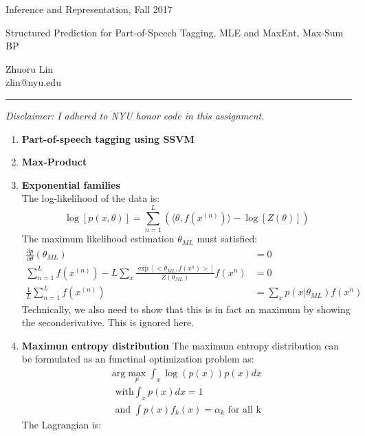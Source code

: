 \documentclass{article}
\newcommand{\ruleskip}{\bigskip\hrule\bigskip}
\begin{document}
\pagestyle{myheadings} 

{\LARGE
\begin{center}Inference and Representation, Fall 2017\end{center}
}

{\Large
Structured Prediction for Part-of-Speech Tagging,
MLE and MaxEnt, Max-Sum BP
}
\begin{center}
Zhuoru Lin\\
zlin@nyu.edu
\end{center}


\ruleskip 
{\em Disclaimer: 
I adhered to NYU honor code in this assignment. }

\begin{enumerate}
\item \textbf{Part-of-speech tagging using SSVM}
\pagebreak
\item \textbf{Max-Product}
\pagebreak
\item \textbf{Exponential families}
\\
The log-likelihood of the data is:
\begin{equation}
\log [p(x, \theta)] = \sum_{n=1}^{L}( \langle \theta, f(x^{(n)}) \rangle - \log[Z(\theta)])
\end{equation}
The maximum likelihood estimation $\theta_{ML}$ must satisfied:
\begin{align}
\frac{\partial p}{ \partial \theta} (\theta_{ML}) &= 0 \\
\sum_{n=1}^{L}f(x^{(n)}) - L\sum_{x} \frac{\exp[<\theta_{ML}, f(x^{n})>] }{Z(\theta_{ML})} f(x^n) &= 0\\
\frac{1}{L} \sum_{n=1}^{L}f(x^{(n)})  &= \sum_{x} p(x | \theta_{ML}) f(x^{n})
\end{align}
Technically, we also need to show that this is in fact an maximum by showing the seconderivative. This is ignored here.
\pagebreak
\item \textbf{Maximun entropy distribution}
The maximum entropy distribution can be formulated as an functinal optimization problem as:
\begin{align*}
\text{arg} \max_{p} \int_x \log(p(x)) p(x) dx \\ 
\text{  with} \int_{x} p(x) dx=1\\
 \text{ and } \int p(x) f_k(x) = \alpha_k \text{  for all k}
\end{align*}
The Lagrangian is:
\begin{equation}

\end{equation}
\end{enumerate}
\end{document}
